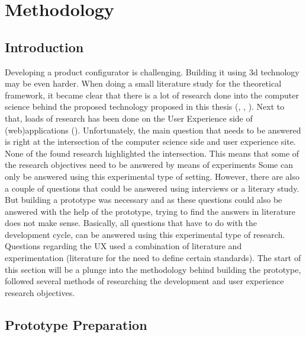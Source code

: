 

\chapter{Methodology}
\label{chapter:methodology}
\section{Introduction}
Developing a product configurator is challenging. Building it using 3d technology may be even harder. When doing a small literature study for the theoretical framework, it became clear that there is a lot of research done into the computer science behind the proposed technology proposed in this thesis (\cite{openGLsite}, \cite{microservices}, \cite{heteregoneousComputingTechniques}). Next to that, loads of research has been done on the User Experience side of (web)applications (\cite{nielsonNormanReports}). Unfortunately, the main question that needs to be answered is right at the intersection of the computer science side and user experience site. None of the found research highlighted the intersection. This means that some of the research objectives need to be answered by means of experiments
Some can only be answered using this experimental type of setting. However, there are also a couple of questions that could be answered using interviews or a literary study. But building a prototype was necessary and as these questions could also be answered with the help of the prototype, trying to find the answers in literature does not make sense.
Basically, all questions that have to do with the development cycle, can be answered using this experimental type of research. Questions regarding the UX used a combination of literature and experimentation (literature for the need to define certain standards). The start of this section will be a plunge into the methodology behind building the prototype, followed several methods of researching the development and user experience research objectives.

\section{Prototype Preparation}
